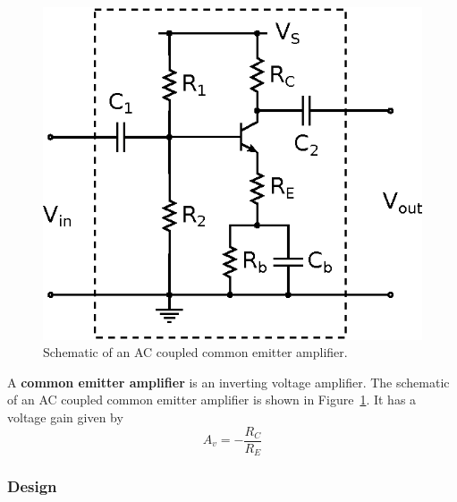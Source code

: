\documentclass[11pt]{article}
\begin{document}
\begin{figure}[ht]
  \begin{center}
    \includegraphics{commonemitter.eps}
    \caption{Schematic of an AC coupled common emitter amplifier.}
    \label{fig:commonemitter}
  \end{center}
\end{figure}

A \textbf{common emitter amplifier} is an inverting voltage
amplifier. The schematic of an AC coupled common emitter amplifier is
shown in Figure~\ref{fig:commonemitter}.  It has a voltage gain given
by
\begin{equation}
  A_v = -\frac{R_C}{R_E}
  \label{eq:commonemittergain}
\end{equation}

\subsubsection*{Design}
\end{document}
